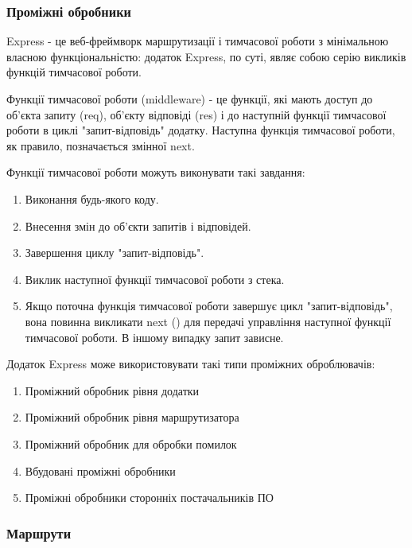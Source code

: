 \subsubsection{Проміжні обробники} \label{subs:middleware}

Express - це веб-фреймворк маршрутизації і тимчасової роботи з мінімальною власною функціональністю: додаток Express, по суті, являє собою серію викликів функцій тимчасової роботи.

Функції тимчасової роботи (middleware) - це функції, які мають доступ до об'єкта запиту (req), об'єкту відповіді (res) і до наступній функції тимчасової роботи в циклі "запит-відповідь" додатку. Наступна функція тимчасової роботи, як правило, позначається змінної next.

Функції тимчасової роботи можуть виконувати такі завдання:

\begin{enumerate}
	\item Виконання будь-якого коду.
	\item Внесення змін до об'єкти запитів і відповідей.
	\item Завершення циклу "запит-відповідь".
	\item Виклик наступної функції тимчасової роботи з стека.
	\item Якщо поточна функція тимчасової роботи завершує цикл "запит-відповідь", вона повинна викликати next () для передачі управління наступної функції тимчасової роботи. В іншому випадку запит зависне.
\end{enumerate}	

Додаток Express може використовувати такі типи проміжних оброблювачів:

\begin{enumerate}
	\item Проміжний обробник рівня додатки
	\item Проміжний обробник рівня маршрутизатора
	\item Проміжний обробник для обробки помилок
	\item Вбудовані проміжні обробники
	\item Проміжні обробники сторонніх постачальників ПО
\end{enumerate}	


\subsubsection{Маршрути}


